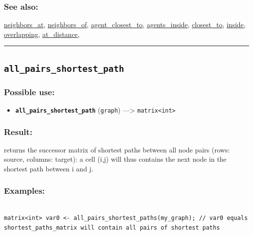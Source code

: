 \documentclass[]{book}
\providecommand{\tightlist}{%
  \setlength{\itemsep}{0pt}\setlength{\parskip}{0pt}}
\theoremstyle{definition}
\theoremstyle{definition}
\theoremstyle{definition}
\theoremstyle{remark}
\begin{document}
\subsubsection{See also:}\label{see-also-23}

\href{operators-n-to-r.html\#neighbors_at}{neighbors\_at},
\href{operators-n-to-r.html\#neighbors_of}{neighbors\_of},
\href{operators-a-to-a.html\#agent_closest_to}{agent\_closest\_to},
\href{operators-a-to-a.html\#agents_inside}{agents\_inside},
\href{operators-b-to-c.html\#closest_to}{closest\_to},
\href{operators-i-to-m.html\#inside}{inside},
\href{operators-n-to-r.html\#overlapping}{overlapping},
\href{operators-a-to-a.html\#at_distance}{at\_distance},

\begin{center}\rule{0.5\linewidth}{\linethickness}\end{center}

\subsection{\texorpdfstring{\texttt{all\_pairs\_shortest\_path}}{all\_pairs\_shortest\_path}}\label{all_pairs_shortest_path}

\subsubsection{Possible use:}\label{possible-use-32}

\begin{itemize}
\tightlist
\item
  \textbf{\texttt{all\_pairs\_shortest\_path}} (\texttt{graph})
  ---\textgreater{} \texttt{matrix\textless{}int\textgreater{}}
\end{itemize}

\subsubsection{Result:}\label{result-31}

returns the successor matrix of shortest paths between all node pairs
(rows: source, columns: target): a cell (i,j) will thus contains the
next node in the shortest path between i and j.

\subsubsection{Examples:}\label{examples-25}

\begin{verbatim}
 
matrix<int> var0 <- all_pairs_shortest_paths(my_graph); // var0 equals shortest_paths_matrix will contain all pairs of shortest paths
\end{verbatim}
\end{document}

